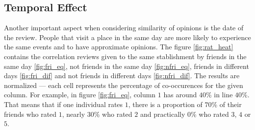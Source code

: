 \subsection{Temporal Effect}
Another important aspect when considering similarity of opinions is the date of
the review. People that visit a place in the same day are more likely to
experience the same events and to have approximate opinions. The figure
\ref{fig:rat_heat} contains the correlation reviews given to the same
stablishment by friends in the same day \ref{fig:fri_eq}, not friends in the
same day \ref{fig:nfri_eq}, friends in different days \ref{fig:fri_dif} and not
friends in different days \ref{fig:nfri_dif}. The results are normalized ---
each cell represents the percentage of co-occurences for the given column. For
example, in figure \ref{fig:fri_eq}, column $1$ has around $40$\% in line
$40$\%. That means that if one individual rates $1$, there is a proportion of
$70$\% of their friends who rated $1$, nearly $30$\% who rated $2$ and
practically $0$\% who rated $3$, $4$ or $5$.

